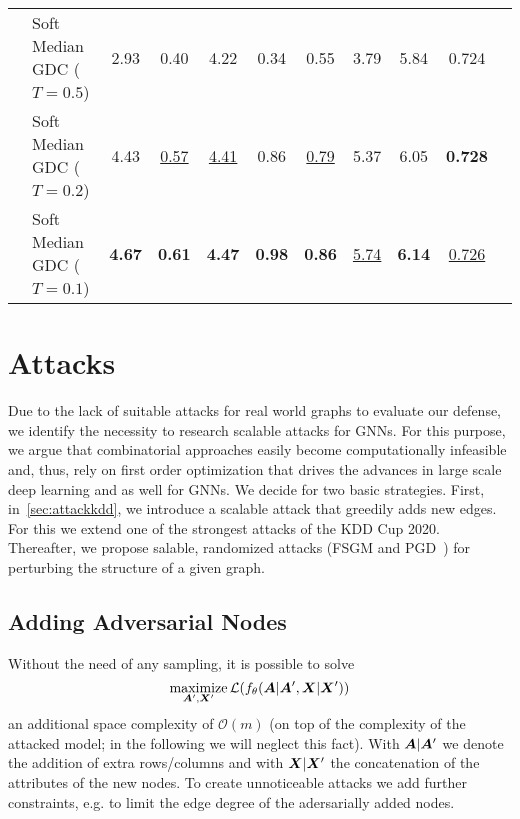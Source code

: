 \documentclass{article} %
\newcommand{\adj}{\mA}
\newcommand{\features}{\mX}
\DeclareMathOperator*{\maximize}{maximize}
\begin{document}
\begin{table}
{\begin{tabular}{llccccccccc}
                             & Soft Median GDC ($T=0.5$) &                         2.93 &              0.40 &              4.22 &                      0.34 &              0.55 &                      3.79 &              5.84 &              0.724 \\
                             & Soft Median GDC ($T=0.2$) &                         4.43 &  \underline{0.57} &  \underline{4.41} &                      0.86 &  \underline{0.79} &                      5.37 &              6.05 &     \textbf{0.728} \\
                             & Soft Median GDC ($T=0.1$) &                \textbf{4.67} &     \textbf{0.61} &     \textbf{4.47} &             \textbf{0.98} &     \textbf{0.86} &          \underline{5.74} &     \textbf{6.14} &  \underline{0.726} \\
    \bottomrule
    \end{tabular}
}
\end{table}

\clearpage
\section{Attacks} %

Due to the lack of suitable attacks for real world graphs to evaluate our defense, we identify the necessity to research scalable attacks for GNNs. For this purpose, we argue that combinatorial approaches easily become computationally infeasible and, thus, rely on first order optimization that drives the advances in large scale deep learning and as well for GNNs. We decide for two basic strategies. First, in~\autoref{sec:attackkdd}, we introduce a scalable attack that greedily adds new edges. For this we extend one of the strongest attacks of the KDD Cup 2020. Thereafter, we propose salable, randomized attacks (FSGM and PGD~\citet{Xu2019a}) for perturbing the structure of a given graph.

\subsection{Adding Adversarial Nodes}\label{sec:attackkdd}

Without the need of any sampling, it is possible to solve
\begin{equation}\label{eq:gang}
    \maximize_{\adj^\prime, \features^\prime} \mathcal{L}(f_{\theta}(\adj | \adj^\prime, \features | \features^\prime))
\end{equation}
an additional space complexity of \(\mathcal{O}(m)\) (on top of the complexity of the attacked model; in the following we will neglect this fact). With \(\adj | \adj^\prime\) we denote the addition of extra rows/columns and with \(\features | \features^\prime\) the concatenation of the attributes of the new nodes. To create unnoticeable attacks we add further constraints, e.g. to limit the edge degree of the adersarially added nodes.
\end{document}
